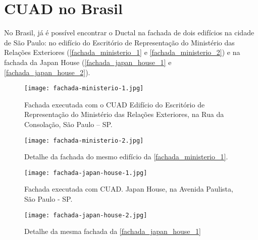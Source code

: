 \section{CUAD no Brasil}

No Brasil, já é possível encontrar o Ductal\textsuperscript{\textregistered} na fachada de dois edifícios na cidade de São Paulo: no edifício do Escritório de Representação do Ministério das Relações Exteriores (\autoref{fachada_ministerio_1} e \autoref{fachada_ministerio_2}) e na fachada da Japan House (\autoref{fachada_japan_house_1} e \autoref{fachada_japan_house_2}).

\begin{figure}[htb]
	\caption{\label{fachada_ministerio_1}Fachada executada com o CUAD Edifício do Escritório de Representação do Ministério das Relações Exteriores, na Rua da Consolação, São Paulo – SP.}
	\begin{center}
	    \texttt{[image: fachada-ministerio-1.jpg]}
	\end{center}
\end{figure}

\begin{figure}[htb]
	\caption{\label{fachada_ministerio_2}Detalhe da fachada do mesmo edifício da \autoref{fachada_ministerio_1}.}
	\begin{center}
	    \texttt{[image: fachada-ministerio-2.jpg]}
	\end{center}
\end{figure}

\begin{figure}[htb]
	\caption{\label{fachada_japan_house_1}Fachada executada com CUAD. Japan House, na Avenida Paulista, São Paulo - SP.}
	\begin{center}
	    \texttt{[image: fachada-japan-house-1.jpg]}
	\end{center}
\end{figure}

\begin{figure}[htb]
	\caption{\label{fachada_japan_house_2}Detalhe da mesma fachada da \autoref{fachada_japan_house_1}}
	\begin{center}
	    \texttt{[image: fachada-japan-house-2.jpg]}
	\end{center}
\end{figure}

